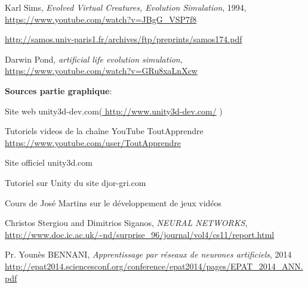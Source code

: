 \begin{thebibliography}{99}



 

Karl Sims,
 \emph{Evolved Virtual Creatures, Evolution Simulation}, 1994,
 \url{https://www.youtube.com/watch?v=JBgG\_VSP7f8}

 \url{http://samos.univ-paris1.fr/archives/ftp/preprints/samos174.pdf}

Darwin Pond,
\emph{artificial life evolution simulation},
\url{https://www.youtube.com/watch?v=GRu8xaLnXcw}


 \vspace{3\baselineskip}
\textbf{ Sources partie graphique}:

 Site web unity3d-dev.com(\url{ http://www.unity3d-dev.com/}  )

Tutoriels videos de la chaîne YouTube ToutApprendre \url{https://www.youtube.com/user/ToutApprendre}

Site officiel unity3d.com

Tutoriel sur Unity du site djor-gri.com

Cours de José Martins sur le développement de jeux vidéos

Christos Stergiou and Dimitrios Siganos,
\emph{NEURAL NETWORKS}, 
\url{http://www.doc.ic.ac.uk/~nd/surprise_96/journal/vol4/cs11/report.html}

Pr. Younès BENNANI,
\emph{Apprentissage par réseaux de neurones artificiels}, 2014
\url{http://epat2014.sciencesconf.org/conference/epat2014/pages/EPAT_2014_ANN.pdf}


\end{thebibliography}

